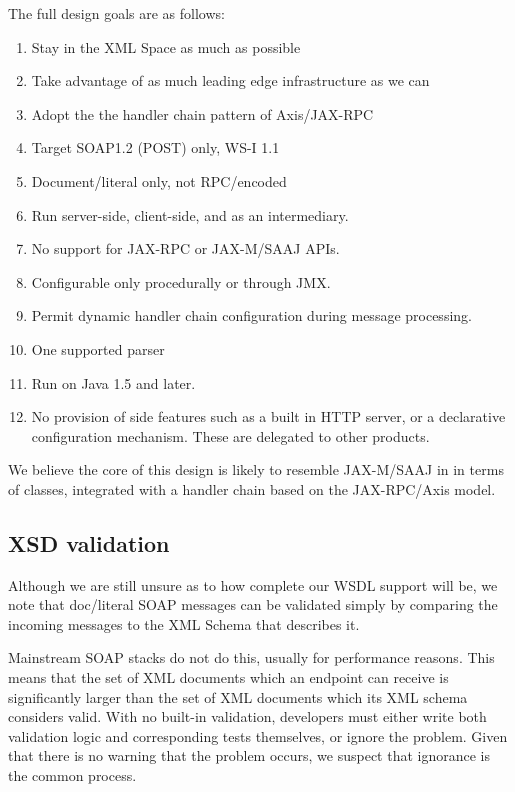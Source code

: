 The full design goals are as follows:

\begin{enumerate}

\item Stay in the XML Space as much as possible
\item Take advantage of as much leading edge infrastructure as we can
\item Adopt the the handler chain pattern of Axis/JAX-RPC
\item Target SOAP1.2 (POST) only, WS-I 1.1
\item Document/literal only, not RPC/encoded
\item Run server-side, client-side, and as an intermediary. 
\item No support for JAX-RPC or JAX-M/SAAJ APIs.
\item Configurable only procedurally or through JMX.
\item Permit dynamic handler chain configuration during message processing.
\item One supported parser %
\item Run on Java 1.5 and later. 

\item No provision of side features such as a built in HTTP server, or
a declarative configuration mechanism. These are delegated to other products.
\end{enumerate}

We believe the core of this design is likely to resemble JAX-M/SAAJ in
in terms of classes, integrated with a handler chain based on the
JAX-RPC/Axis model.

\subsection{XSD validation}
\label{alpine:validation}

Although we are still unsure as to how complete our WSDL support will be, 
we note that doc/literal SOAP messages can be validated simply by comparing
the incoming messages to the XML Schema that describes it. 

Mainstream SOAP stacks do not do this, usually for performance
reasons. This means that the set of XML documents which an endpoint can receive
is significantly larger than the set of XML documents which its XML
schema considers valid. With no built-in validation, developers must
either write both validation logic and corresponding tests themselves,
or ignore the problem. Given that there is no warning that the problem
occurs, we suspect that ignorance is the common process. 

